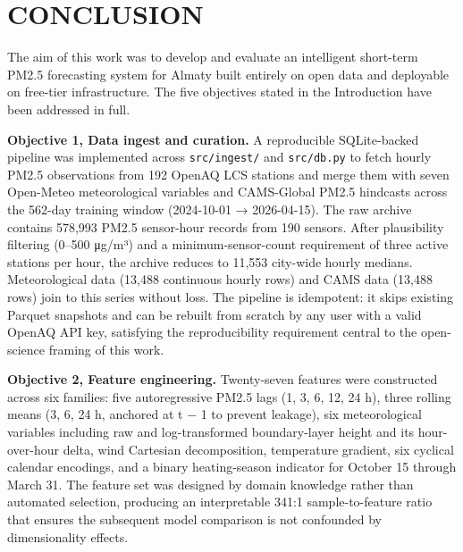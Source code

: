 \section{CONCLUSION}\label{conclusion}

The aim of this work was to develop and evaluate an intelligent short-term PM2.5 forecasting system for Almaty built entirely on open data and deployable on free-tier infrastructure. The five objectives stated in the Introduction have been addressed in full.

\textbf{Objective 1, Data ingest and curation.} A reproducible SQLite-backed pipeline was implemented across \texttt{src/ingest/} and \texttt{src/db.py} to fetch hourly PM2.5 observations from 192 OpenAQ LCS stations and merge them with seven Open-Meteo meteorological variables and CAMS-Global PM2.5 hindcasts across the 562-day training window (2024-10-01 → 2026-04-15). The raw archive contains 578,993 PM2.5 sensor-hour records from 190 sensors. After plausibility filtering (0--500 μg/m³) and a minimum-sensor-count requirement of three active stations per hour, the archive reduces to 11,553 city-wide hourly medians. Meteorological data (13,488 continuous hourly rows) and CAMS data (13,488 rows) join to this series without loss. The pipeline is idempotent: it skips existing Parquet snapshots and can be rebuilt from scratch by any user with a valid OpenAQ API key, satisfying the reproducibility requirement central to the open-science framing of this work.

\textbf{Objective 2, Feature engineering.} Twenty-seven features were constructed across six families: five autoregressive PM2.5 lags (1, 3, 6, 12, 24 h), three rolling means (3, 6, 24 h, anchored at t − 1 to prevent leakage), six meteorological variables including raw and log-transformed boundary-layer height and its hour-over-hour delta, wind Cartesian decomposition, temperature gradient, six cyclical calendar encodings, and a binary heating-season indicator for October 15 through March 31. The feature set was designed by domain knowledge rather than automated selection, producing an interpretable 341:1 sample-to-feature ratio that ensures the subsequent model comparison is not confounded by dimensionality effects.

